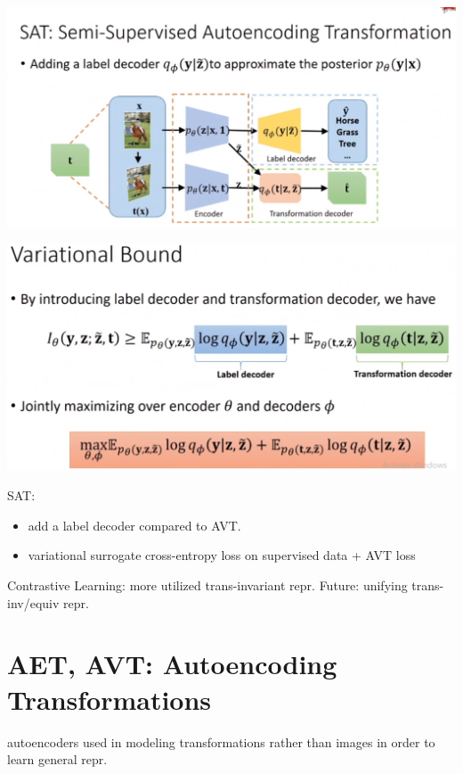 \documentclass{article}
\begin{document}
    \centerline{\includegraphics[width=0.8\paperwidth]{sat.PNG}}
    \centerline{\includegraphics[width=0.8\paperwidth]{sat-loss.PNG}}
    SAT:
    \begin{itemize}
        \item add a label decoder compared to AVT.
        \item variational surrogate \trarr cross-entropy loss on supervised data + AVT loss
    \end{itemize}

    Contrastive Learning: more utilized trans-invariant repr.
    Future: unifying trans-inv/equiv repr.

\section{AET, AVT: Autoencoding Transformations}

     autoencoders used in modeling transformations rather than images in order to learn general repr.
\end{document}
